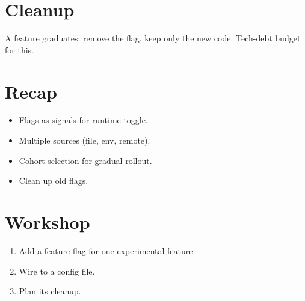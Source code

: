 \section{Cleanup}

A feature graduates: remove the flag, keep only the new
code. Tech-debt budget for this.

\section{Recap}

\begin{recap}
\begin{itemize}[leftmargin=*]
  \item Flags as signals for runtime toggle.
  \item Multiple sources (file, env, remote).
  \item Cohort selection for gradual rollout.
  \item Clean up old flags.
\end{itemize}
\end{recap}

\section*{Workshop}

\begin{enumerate}[leftmargin=*]
  \item Add a feature flag for one experimental
    feature.
  \item Wire to a config file.
  \item Plan its cleanup.
\end{enumerate}
